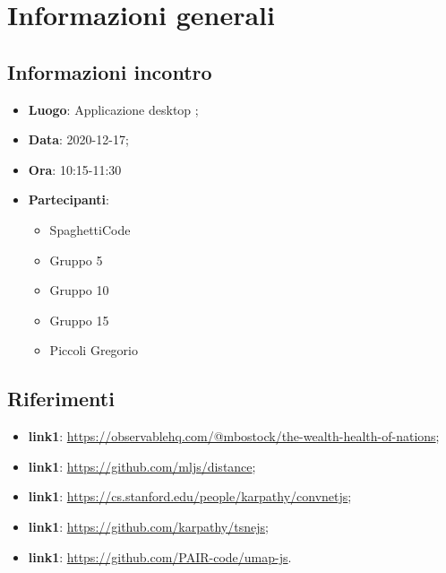 \documentclass{article}
\begin{document}
	
	

\section{Informazioni generali}
\label{sec:info_generali}

\subsection{Informazioni incontro}
\label{sub:info_incontro}

\begin{itemize}
	\item \textbf{Luogo}: Applicazione desktop ;
	\item \textbf{Data}: 2020-12-17;
	\item \textbf{Ora}: 10:15-11:30
	\item \textbf{Partecipanti}:
	\begin{itemize}
		\item SpaghettiCode
		\item Gruppo 5
		\item Gruppo 10
		\item Gruppo 15
		\item Piccoli Gregorio
	\end{itemize}
\end{itemize}
    
\subsection{Riferimenti}%
\label{sub:riferimenti}

\begin{itemize}
    \item \textbf{link1}: \url{https://observablehq.com/@mbostock/the-wealth-health-of-nations};
    \item \textbf{link1}: \url{https://github.com/mljs/distance};
    \item \textbf{link1}: \url{https://cs.stanford.edu/people/karpathy/convnetjs};
    \item \textbf{link1}: \url{https://github.com/karpathy/tsnejs};
    \item \textbf{link1}: \url{https://github.com/PAIR-code/umap-js}.
  \end{itemize}
\end{document}
